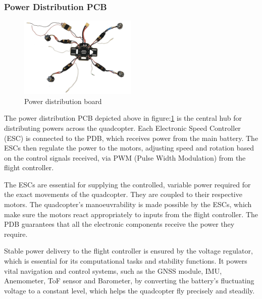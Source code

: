 \documentclass{article}
\begin{document}
\subsubsection{Power Distribution PCB}
\begin{figure}[H]
  \centering
  \includegraphics[width=0.5\textwidth]{Pictures/power_distribution_and_escs.png}
  \caption{Power distribution board}
  \label{fig:power_distribution}
\end{figure}
The power distribution PCB depicted above in figure:\ref{fig:power_distribution} is the central hub for distributing powers across the quadcopter. Each Electronic Speed Controller (ESC) is connected to the PDB, which receives power from the main battery. The ESCs then regulate the power to the motors, adjusting speed and rotation based on the 
control signals received, via PWM (Pulse Width Modulation) from the flight controller.

The ESCs are essential for supplying the controlled, variable power required for the exact movements of the quadcopter. They are coupled to their respective motors. The quadcopter's manoeuvrability is made possible by the ESCs, which make sure the motors react appropriately to inputs from the flight controller. The PDB guarantees that all 
the electronic components receive the power they require.

Stable power delivery to the flight controller is ensured by the voltage regulator, which is essential for its computational tasks and stability functions. It powers vital navigation and control systems, such as the GNSS module, IMU, Anemometer, ToF sensor and Barometer, by converting the battery's fluctuating voltage to a constant level, 
which helps the quadcopter fly precisely and steadily.
\end{document}
